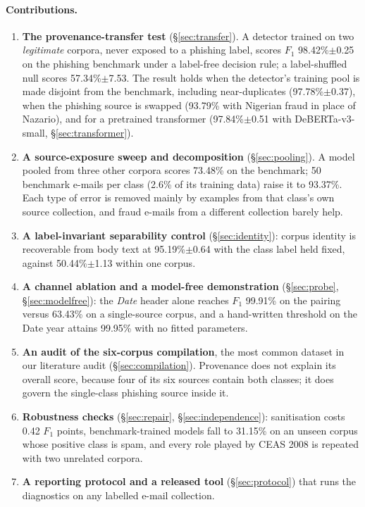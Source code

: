 \documentclass[twoside,11pt]{article}
\begin{document}
\paragraph{Contributions.}
\begin{enumerate}\itemsep2pt
\item \textbf{The provenance-transfer test} (\S\ref{sec:transfer}). A
detector trained on two \emph{legitimate} corpora, never exposed to a
phishing label, scores $F_1$ 98.42\%$\pm$0.25 on the phishing benchmark under
a label-free decision rule; a label-shuffled null scores 57.34\%$\pm$7.53.
The result holds when the detector's training pool is made disjoint from the
benchmark, including near-duplicates (97.78\%$\pm$0.37), when the phishing
source is swapped (93.79\% with Nigerian fraud in place of Nazario), and for a
pretrained transformer (97.84\%$\pm$0.51 with DeBERTa-v3-small,
\S\ref{sec:transformer}).

\item \textbf{A source-exposure sweep and decomposition}
(\S\ref{sec:pooling}). A model pooled from three other corpora scores 73.48\%
on the benchmark; 50 benchmark e-mails per class (2.6\% of its training data)
raise it to 93.37\%. Each type of error is removed mainly by examples from that
class's own source collection, and fraud e-mails from a different collection
barely help.

\item \textbf{A label-invariant separability control} (\S\ref{sec:identity}):
corpus identity is recoverable from body text at 95.19\%$\pm$0.64 with the
class label held fixed, against 50.44\%$\pm$1.13 within one corpus.

\item \textbf{A channel ablation and a model-free demonstration}
(\S\ref{sec:probe}, \S\ref{sec:modelfree}): the \emph{Date} header alone
reaches $F_1$ 99.91\% on the pairing versus 63.43\% on a single-source corpus,
and a hand-written threshold on the Date year attains 99.95\% with no fitted
parameters.

\item \textbf{An audit of the six-corpus compilation}, the most common
dataset in our literature audit (\S\ref{sec:compilation}). Provenance does
not explain its overall score, because four of its six sources contain both
classes; it does govern the single-class phishing source inside it.

\item \textbf{Robustness checks} (\S\ref{sec:repair},
\S\ref{sec:independence}): sanitisation costs 0.42 $F_1$ points,
benchmark-trained models fall to 31.15\% on an unseen corpus whose positive
class is spam, and every role
played by CEAS 2008 is repeated with two unrelated corpora.

\item \textbf{A reporting protocol and a released tool}
(\S\ref{sec:protocol}) that runs the diagnostics on any labelled e-mail
collection.
\end{enumerate}
\end{document}
